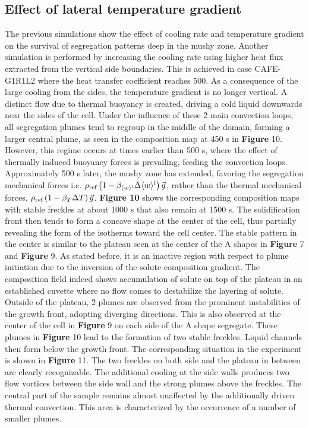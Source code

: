 \subsection{Effect of lateral temperature gradient}
The previous simulations show the effect of cooling rate and temperature gradient on the survival of segregation patterns deep 
in the mushy zone. Another simulation is performed by increasing the cooling rate using higher heat flux extracted from the 
vertical side boundaries. This is achieved in case CAFE-G1R1L2 where the heat transfer coefficient reaches \SI{500}{\uhconvec}. 
As a consequence of the large cooling from the sides, the temperature gradient is no longer vertical. A distinct flow due to 
thermal buoyancy is created, driving a cold liquid downwards near the sides of the cell. Under the influence of these 2 main 
convection loops, all segregation plumes tend to regroup in the middle of the domain, forming a larger central plume, as seen in 
the composition map at 450 s in \textbf{Figure} 10. However, this regime occurs at times earlier than 500 s, where the effect of thermally 
induced buoyancy forces is prevailing, feeding the convection loops. Approximately 500 s later, the mushy zone has extended, favoring 
the segregation mechanical forces i.e.  $\rho_{\text{ref}} \left( 1-\beta_{\langle w \rangle^l} \Delta \langle w \rangle^l \right) \vec{g}$, rather than the thermal mechanical forces, $\rho_{\text{ref}} \left( 1-\beta_T \Delta T \right) \vec{g}$. 
\textbf{Figure 10} shows the corresponding composition maps with stable freckles at about 1000 s that also remain at 1500 s. The solidification 
front then tends to form a concave shape at the center of the cell, thus partially revealing the form of the isotherms toward the cell 
center. The stable pattern in the center is similar to the plateau seen at the center of the A shapes in \textbf{Figure} 7 and \textbf{Figure} 9. As stated 
before, it is an inactive region with respect to plume initiation due to the inversion of the solute composition gradient. The composition 
field indeed shows accumulation of solute on top of the plateau in an established cuvette where no flow comes to destabilize the layering 
of solute. Outside of the plateau, 2 plumes are observed from the prominent instabilities of the growth front, adopting diverging directions. 
This is also observed at the center of the cell in \textbf{Figure} 9 on each side of the A shape segregate. These plumes in \textbf{Figure} 10 lead to the 
formation of two stable freckles. Liquid channels then form below the growth front.
The corresponding situation in the experiment is shown in \textbf{Figure} 11. The two freckles on both side and the plateau in between are clearly 
recognizable. The additional cooling at the side walls produces two flow vortices between the side wall and the strong plumes above the 
freckles. The central part of the sample remains almost unaffected by the additionally driven thermal convection. This area is characterized by 
the occurrence of a number of smaller plumes.  




